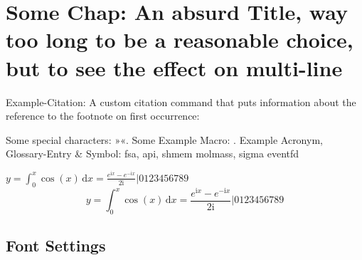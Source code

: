 %

\chapter[Alternative \enquote{Some Chap} Title. Shorter for page-heading]{Some Chap: An absurd Title, way too long to be a reasonable choice, but to see the effect on multi-line}
\label{chap:chapter1}


Example-Citation:
\cite{DenKr_denkrement1_indeco}
\nl%
A custom citation command that puts information about the reference to the footnote on first occurrence:
%

\npi%
Some special characters:
»«.
\nl%
Some Example Macro:
.
\nl%
Example Acronym, Glossary-Entry \& Symbol:\nl
\gls{fsa}, \gls{api}, \gls{shmem}\nl
\gls{molmass}, \gls{sigma}\nl
\gls{eventfd}

\np
\newcommand{\I}{\mathrm{i}}
$y = \int_0^x\cos(x)\,\mathrm{d}{x} = \frac{e^{\I x} - e^{-\I x}}{2\I} | 0123456789$
\nl
\begin{equation}
y = \int_0^x\cos(x)\,\mathrm{d}{x} = \frac{e^{\I x} - e^{-\I x}}{2\I} | 0123456789
\end{equation}







\section{Font Settings}

